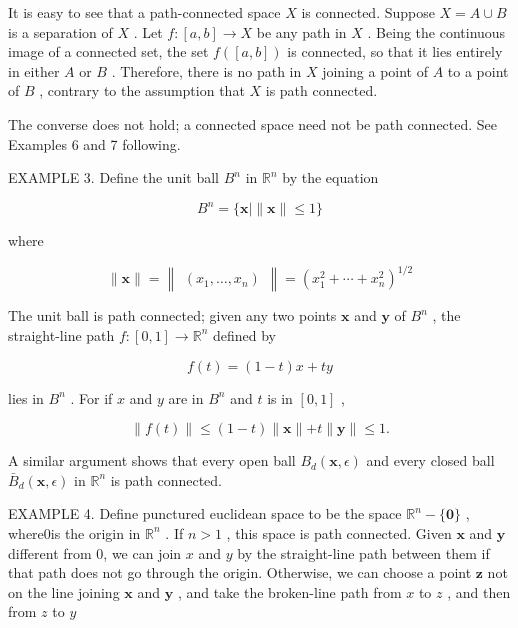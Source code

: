 It is easy to see that a path-connected space \(X\) is connected. Suppose \(X = A \cup  B\) is a separation of \(X\) . Let \(f : \left\lbrack  {a,b}\right\rbrack   \rightarrow  X\) be any path in \(X\) . Being the continuous image of a connected set, the set \(f\left( \left\lbrack  {a,b}\right\rbrack  \right)\) is connected, so that it lies entirely in either \(A\) or \(B\) . Therefore, there is no path in \(X\) joining a point of \(A\) to a point of \(B\) , contrary to the assumption that \(X\) is path connected.

The converse does not hold; a connected space need not be path connected. See Examples 6 and 7 following.

EXAMPLE 3. Define the unit ball \({B}^{n}\) in \({\mathbb{R}}^{n}\) by the equation

\[
{B}^{n} = \{ \mathbf{x} \mid  \parallel \mathbf{x}\parallel  \leq  1\}
\]

where

\[
\parallel \mathbf{x}\parallel  = \begin{Vmatrix}\left( {{x}_{1},\ldots ,{x}_{n}}\right) \end{Vmatrix} = {\left( {x}_{1}^{2} + \cdots  + {x}_{n}^{2}\right) }^{1/2}
\]

The unit ball is path connected; given any two points \(\mathbf{x}\) and \(\mathbf{y}\) of \({B}^{n}\) , the straight-line path \(f : \left\lbrack  {0,1}\right\rbrack   \rightarrow  {\mathbb{R}}^{n}\) defined by

\[
f\left( t\right)  = \left( {1 - t}\right) x + {ty}
\]

lies in \({B}^{n}\) . For if \(x\) and \(y\) are in \({B}^{n}\) and \(t\) is in \(\left\lbrack  {0,1}\right\rbrack\) ,

\[
\parallel f\left( t\right) \parallel  \leq  \left( {1 - t}\right) \parallel \mathbf{x}\parallel  + t\parallel \mathbf{y}\parallel  \leq  1.
\]

A similar argument shows that every open ball \({B}_{d}\left( {\mathbf{x},\epsilon }\right)\) and every closed ball \({\bar{B}}_{d}\left( {\mathbf{x},\epsilon }\right)\) in \({\mathbb{R}}^{n}\) is path connected.

EXAMPLE 4. Define punctured euclidean space to be the space \({\mathbb{R}}^{n} - \{ \mathbf{0}\}\) , where0is the origin in \({\mathbb{R}}^{n}\) . If \(n > 1\) , this space is path connected. Given \(\mathbf{x}\) and \(\mathbf{y}\) different from 0, we can join \(x\) and \(y\) by the straight-line path between them if that path does not go through the origin. Otherwise, we can choose a point \(\mathbf{z}\) not on the line joining \(\mathbf{x}\) and \(\mathbf{y}\) , and take the broken-line path from \(x\) to \(z\) , and then from \(z\) to \(y\)

